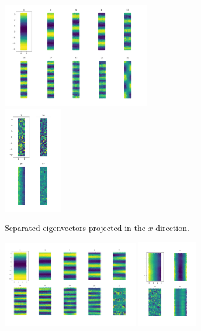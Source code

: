 \documentclass{article}
\numberwithin{equation}{section}
\theoremstyle{definition}
\begin{document}
\begin{figure} 
    \centering
    \begin{subfigure}[t]{\textwidth}
        \centering
        \includegraphics[width=0.71\textwidth]{images/manifold1_rect_circle_(2,3).png}
        \includegraphics[width=0.28\textwidth]{images/manifold2_rect_circle_(2,3).png}
        \caption{Separated eigenvectors projected in the $x$-direction.}
    \end{subfigure}
    \begin{subfigure}[t]{\textwidth}
        \centering
        \includegraphics[width=0.65\textwidth]{images/manifold1_rect_circle_(1,3).png}
        \includegraphics[width=0.29\textwidth]{images/manifold2_rect_circle_(1,3).png}

\end{subfigure}
\end{figure}
\end{document}

